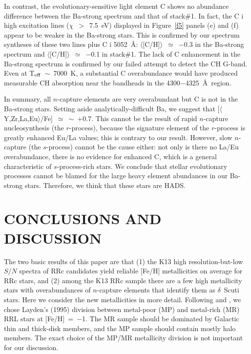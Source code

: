 \documentclass[preprint]{aastex6}
\newcommand\species[2]{#1 {\sc #2}}
\def\teff{\mbox{T$_{\rm eff}$}}
\begin{document}
In contrast, the evolutionary-sensitive light element C shows no abundance 
difference between the Ba-strong spectrum and that of stack\#1.
In fact, the \species{C}{i} high excitation lines ($\chi$~$>$~7.5~eV)
displayed in Figure~\ref{f5} panels (e) and (f) appear to be
weaker in the Ba-strong stars.
This is confirmed by our spectrum syntheses of these two lines plus
\species{C}{i} 5052~\AA: $\langle$[C/H]$\rangle$~$\simeq$~$-$0.3
in the Ba-strong spectrum and 
$\langle$[C/H]$\rangle$~$\simeq$~$-$0.1 in stack\#1.  
The lack of C enhancement in the Ba-strong spectrum is confirmed by our
failed attempt to detect the CH G-band.  
Even at \teff~$\sim$~7000~K, a substantial C overabundance would have
produced measurable CH absorption near the bandheads in the 4300$-$4325~\AA\
region.

In summary, all $n$-capture elements are very overabundant but C is not
in the Ba-strong stars.
Setting aside analytically-difficult Ba, we suggest that
[$\langle$Y,Zr,La,Eu$\rangle$/Fe]~$\simeq$~$\sim$~$+$0.7.  
This cannot be the result of rapid $n$-capture nucleosynthesis (the 
$r$-process), because the signature element of the $r$-process is greatly
enhanced Eu/La values; this is contrary to our result.
However, slow $n$-capture (the $s$-process) cannot be the cause either:
not only is there no La/Eu overabundance, there is no evidence for
enhanced C, which is a general characteristic of $s$-process-rich stars.
We conclude that stellar evolutionary processes cannot be blamed for
the large heavy element abundances in our Ba-strong stars.  
Therefore, we think that these stars are HADS.






\section{CONCLUSIONS AND DISCUSSION}\label{discuss}


The two basic results of this paper are that (1) the K13 
high resolution-but-low $S/N$ spectra of RRc candidates yield reliable 
[Fe/H] metallicities on average for RRc stars, and (2) among the K13 RRc 
sample there are a few high metallicity stars with overabundances of 
$n$-capture elements that identify them as $\delta$~Scuti stars.
Here we consider the new metallicities in more detail.
Following \cite{chadid17} and \cite{sneden17}, we chose Layden's 
(1995)\nocite{layden95a} division between metal-poor (MP) and metal-rich (MR) 
RRL stars at [Fe/H]~=~$-$1. 
The MR sample should be dominated by Galactic thin and thick-disk members,
and the MP sample should contain mostly halo members.
The exact choice of the MP/MR metallicity division is not important for
our discussion.
\end{document}
